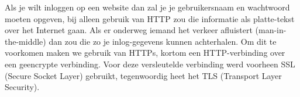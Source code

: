 Als je wilt inloggen op een website dan zal je je gebruikersnaam en wachtwoord moeten opgeven, bij alleen gebruik van HTTP zou die informatie als platte-tekst over het Internet gaan. Als er onderweg iemand het verkeer afluistert (man-in-the-middle) dan zou die zo je inlog-gegevens kunnen achterhalen. Om dit te voorkomen maken we gebruik van HTTPs, kortom een HTTP-verbinding over een geencrypte verbinding. Voor deze versleutelde verbinding werd voorheen SSL (Secure Socket Layer) gebruikt, tegenwoordig heet het TLS (Transport Layer Security).
